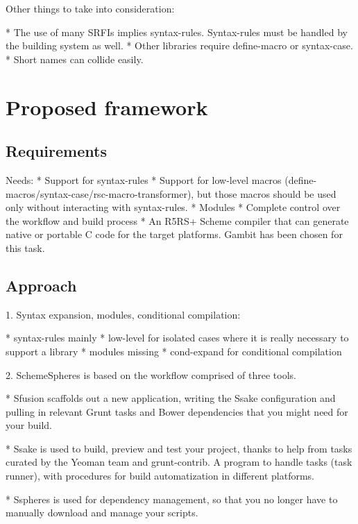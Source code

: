\documentclass{acm_proc_article-sp}
\begin{document}
Other things to take into consideration:

* The use of many SRFIs implies syntax-rules. Syntax-rules must be handled by the building system as well.
* Other libraries require define-macro or syntax-case.
* Short names can collide easily.





\section{Proposed framework}


\subsection{Requirements}
Needs:
* Support for syntax-rules
* Support for low-level macros (define-macros/syntax-case/rsc-macro-transformer), but those macros should be used only without interacting with syntax-rules.
* Modules
* Complete control over the workflow and build process
* An R5RS+ Scheme compiler that can generate native or portable C code for the target platforms. Gambit has been chosen for this task.

\subsection{Approach}

1. Syntax expansion, modules, conditional compilation:

* syntax-rules mainly
* low-level for isolated cases where it is really necessary to support a library
* modules missing
* cond-expand for conditional compilation


2. SchemeSpheres is based on the workflow comprised of three tools.

* Sfusion scaffolds out a new application, writing the Ssake configuration and pulling in relevant Grunt tasks and Bower dependencies that you might need for your build.

* Ssake is used to build, preview and test your project, thanks to help from tasks curated by the Yeoman team and grunt-contrib. A program to handle tasks (task runner), with procedures for build automatization in different platforms.

* Sspheres is used for dependency management, so that you no longer have to manually download and manage your scripts.
\end{document}
